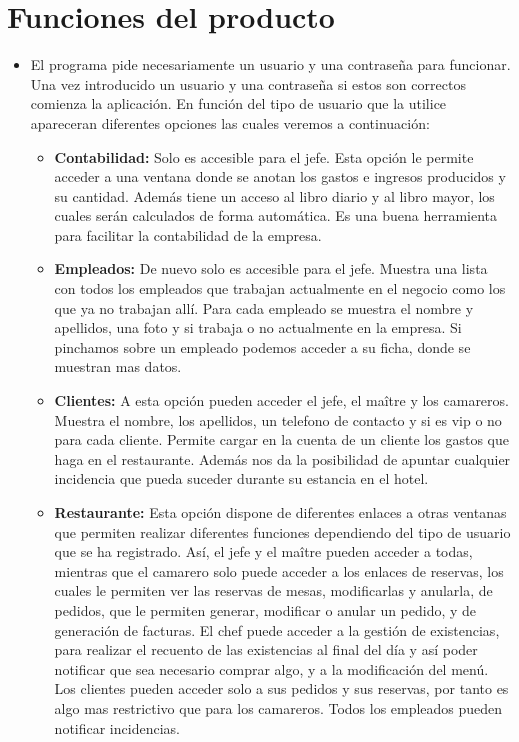 \documentclass[spanish,a4paper,12pt]{report}	%
\begin{document}
\section{Funciones del producto}
	\begin{itemize}
		\item El programa pide necesariamente un usuario y una contraseña para funcionar. Una vez introducido un usuario y una contraseña si estos son correctos comienza la aplicación. En función del tipo de usuario que la utilice apareceran diferentes opciones las cuales veremos a continuación:
		\begin{itemize}
			\item \textbf{Contabilidad:} Solo es accesible para el jefe. Esta opción le permite acceder a una ventana donde se anotan los gastos e ingresos producidos y su cantidad. Además tiene un acceso al libro diario y al libro mayor, los cuales serán calculados de forma automática. Es una buena herramienta para facilitar la contabilidad de la empresa.
			\item \textbf{Empleados:} De nuevo solo es accesible para el jefe. Muestra una lista con todos los empleados que trabajan actualmente en el negocio como los que ya no trabajan allí. Para cada empleado se muestra el nombre y apellidos, una foto y si trabaja o no actualmente en la empresa. Si pinchamos sobre un empleado podemos acceder a su ficha, donde se muestran mas datos.
			\item \textbf{Clientes:} A esta opción pueden acceder el jefe, el maître y los camareros. Muestra el nombre, los apellidos, un telefono de contacto y si es vip o no para cada cliente. Permite cargar en la cuenta de un cliente los gastos que haga en el restaurante. Además nos da la posibilidad de apuntar cualquier incidencia que pueda suceder durante su estancia en el hotel.
			\item \textbf{Restaurante:} Esta opción dispone de diferentes enlaces a otras ventanas que permiten realizar diferentes funciones dependiendo del tipo de usuario que se ha registrado. Así, el jefe y el maître pueden acceder a todas, mientras que el camarero solo puede acceder a los enlaces de reservas, los cuales le permiten ver las reservas de mesas, modificarlas y anularla, de pedidos, que le permiten generar, modificar o anular un pedido, y de generación de facturas. El chef puede acceder a la gestión de existencias, para realizar el recuento de las existencias al final del día y así poder notificar que sea necesario comprar algo, y a la modificación del menú. Los clientes pueden acceder solo a sus pedidos y sus reservas, por tanto es algo mas restrictivo que para los camareros. Todos los empleados pueden notificar incidencias.

\end{itemize}
\end{itemize}
\end{document}
